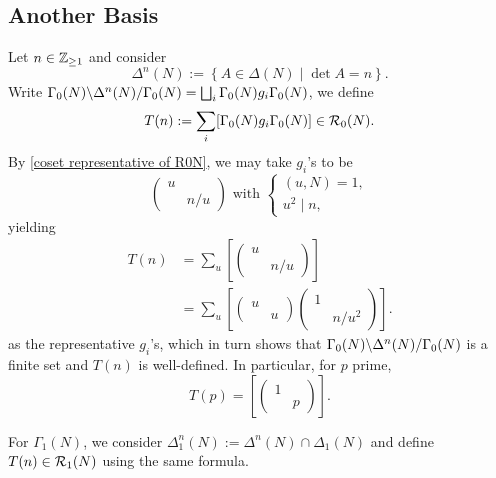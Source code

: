 \subsection{Another Basis}
\begin{definition}
    Let $n\in\Z_{\ge 1}$ and consider \[\Delta^n(N) := \left\{ A\in\Delta(N)\mid \det A = n \right\}.\]
    Write $\bico{\Delta^n(N )}{\Gamma_0(N)}{\Gamma_0(N)} = \bigsqcup_{i} \Gamma_0(N)g_i\Gamma_0(N)$,
    we define \[T(n) := \sum_{i} [\Gamma_0(N)g_i\Gamma_0(N)]
    \in\hecke_0(N).\]
    By \cref{coset representative of R0N}, we may take $g_i$'s to be \[\begin{pmatrix}
        u & \\ & n/u
    \end{pmatrix}\text{  with }\begin{cases}
        (u, N) = 1,\\ u^2\mid n,
    \end{cases}\]yielding\begin{align*}
        T(n) &= \sum_{u} \left[ \begin{pmatrix}
            u & \\ & n/u
        \end{pmatrix} \right]\\ 
        &=\sum_{u} \left[ \begin{pmatrix}
            u & \\ & u
        \end{pmatrix}\begin{pmatrix}
            1 & \\ & n/u^2
        \end{pmatrix} \right].
    \end{align*}
    as the representative $g_i$'s, which in turn shows that $\bico{\Delta^n(N )}{\Gamma_0(N)}{\Gamma_0(N)}$ is a finite set and $T(n)$ is well-defined.
    In particular, for $p$ prime, \[T(p) = \left[ \begin{pmatrix}
        1&\\ &p
    \end{pmatrix} \right].\]

    For $\Gamma_1(N)$, we consider $\Delta^n_1(N) := \Delta^n(N)\cap \Delta_1(N)$ and define $T(n)\in \hecke_{1}(N)$ using the same formula.
\end{definition}

